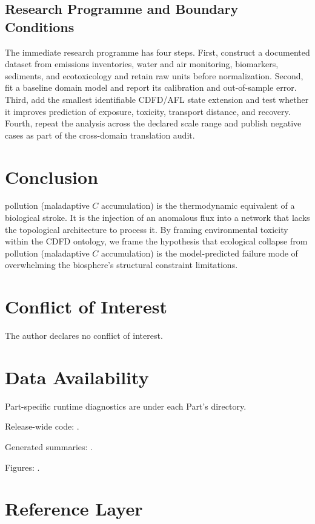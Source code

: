 \documentclass[11pt,a4paper]{article}
\begin{document}
\subsection{Research Programme and Boundary Conditions}

The immediate research programme has four steps. First, construct a documented
dataset from emissions inventories, water and air monitoring, biomarkers, sediments, and ecotoxicology and retain raw units before normalization.
Second, fit a baseline domain model and report its calibration and out-of-sample
error. Third, add the smallest identifiable CDFD/AFL state extension and test
whether it improves prediction of exposure, toxicity, transport distance, and recovery. Fourth, repeat the
analysis across the declared scale range and publish negative cases as part of
the cross-domain translation audit.


\section{Conclusion}
pollution (maladaptive $C$ accumulation) is the thermodynamic equivalent of a biological stroke. It is the injection of an anomalous flux into a network that lacks the topological architecture to process it. By framing environmental toxicity within the CDFD ontology, we frame the hypothesis that ecological collapse from pollution (maladaptive $C$ accumulation) is the model-predicted failure mode of overwhelming the biosphere's structural constraint limitations.
\section*{Conflict of Interest} The author declares no conflict of interest.
\section*{Data Availability}
Part-specific runtime diagnostics are under each Part's  directory.

Release-wide code: .

Generated summaries: .

Figures: .


\section{Reference Layer}


\end{document}
